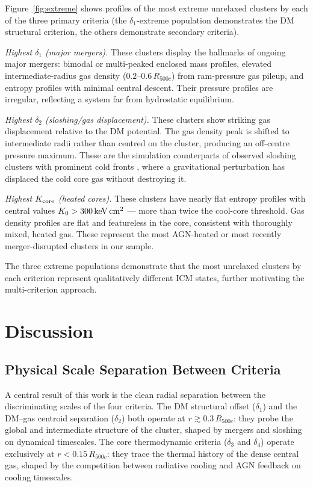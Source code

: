 \documentclass[12pt]{article}
\newcommand{\Rfive}{R_{500c}}
\newcommand{\Kcore}{K_{\rm core}}
\newcommand{\deltai}{\delta_1}
\newcommand{\deltaii}{\delta_2}
\newcommand{\deltaiii}{\delta_3}
\newcommand{\deltaiv}{\delta_4}
\newcommand{\kevcm}{{\rm keV\,cm^2}}
\begin{document}
Figure~\ref{fig:extreme} shows profiles of the most extreme unrelaxed clusters by each
of the three primary criteria (the $\deltai$-extreme population demonstrates the DM
structural criterion, the others demonstrate secondary criteria).

\textit{Highest $\deltai$ (major mergers).}
These clusters display the hallmarks of ongoing major mergers: bimodal or multi-peaked
enclosed mass profiles, elevated intermediate-radius gas density ($0.2$--$0.6\,\Rfive$)
from ram-pressure gas pileup, and entropy profiles with minimal central descent.
Their pressure profiles are irregular, reflecting a system far from hydrostatic
equilibrium.

\textit{Highest $\deltaii$ (sloshing/gas displacement).}
These clusters show striking gas displacement relative to the DM potential.
The gas density peak is shifted to intermediate radii rather than centred on the cluster,
producing an off-centre pressure maximum.  These are the simulation counterparts of
observed sloshing clusters with prominent cold fronts \citep{markevitch2007}, where a
gravitational perturbation has displaced the cold core gas without destroying it.

\textit{Highest $\Kcore$ (heated cores).}
These clusters have nearly flat entropy profiles with central values
$K_0 > 300\,\kevcm$ --- more than twice the cool-core threshold.  Gas density profiles
are flat and featureless in the core, consistent with thoroughly mixed, heated gas.
These represent the most AGN-heated or most recently merger-disrupted clusters in our
sample.

The three extreme populations demonstrate that the most unrelaxed clusters by each
criterion represent qualitatively different ICM states, further motivating the
multi-criterion approach.

\FloatBarrier
\section{Discussion}
\label{sec:discuss}

\subsection{Physical Scale Separation Between Criteria}

A central result of this work is the clean radial separation between the discriminating
scales of the four criteria.  The DM structural offset ($\deltai$) and the DM--gas
centroid separation ($\deltaii$) both operate at $r \gtrsim 0.3\,\Rfive$: they probe
the global and intermediate structure of the cluster, shaped by mergers and sloshing
on dynamical timescales.  The core thermodynamic criteria ($\deltaiii$ and $\deltaiv$)
operate exclusively at $r < 0.15\,\Rfive$: they trace the thermal history of the dense
central gas, shaped by the competition between radiative cooling and AGN feedback on
cooling timescales.
\end{document}
